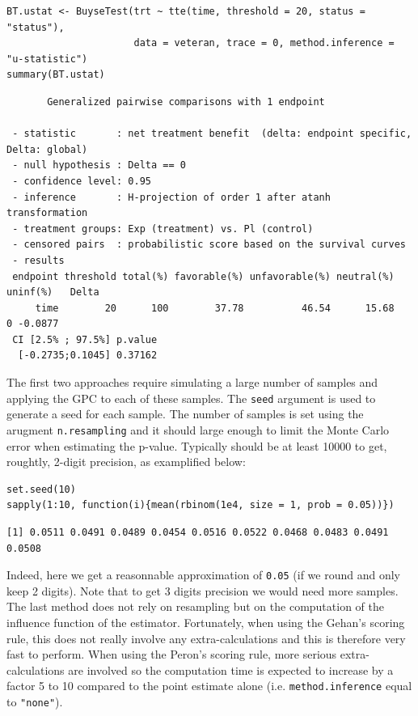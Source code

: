 \documentclass[12pt]{article}
\begin{document}
\lstset{language=r,label= ,caption= ,captionpos=b,numbers=none}
\begin{lstlisting}
BT.ustat <- BuyseTest(trt ~ tte(time, threshold = 20, status = "status"),
                      data = veteran, trace = 0, method.inference = "u-statistic") 
summary(BT.ustat)
\end{lstlisting}

\begin{verbatim}
       Generalized pairwise comparisons with 1 endpoint

 - statistic       : net treatment benefit  (delta: endpoint specific, Delta: global) 
 - null hypothesis : Delta == 0 
 - confidence level: 0.95 
 - inference       : H-projection of order 1 after atanh transformation 
 - treatment groups: Exp (treatment) vs. Pl (control) 
 - censored pairs  : probabilistic score based on the survival curves
 - results
 endpoint threshold total(%) favorable(%) unfavorable(%) neutral(%) uninf(%)   Delta
     time        20      100        37.78          46.54      15.68        0 -0.0877
 CI [2.5% ; 97.5%] p.value 
  [-0.2735;0.1045] 0.37162
\end{verbatim}

The first two approaches require simulating a large number of samples
and applying the GPC to each of these samples. The \texttt{seed} argument is
used to generate a seed for each sample. The number of samples is set
using the arugment \texttt{n.resampling} and it should large enough to limit
the Monte Carlo error when estimating the p-value. Typically should be
at least 10000 to get, roughtly, 2-digit precision, as examplified
below:
\lstset{language=r,label= ,caption= ,captionpos=b,numbers=none}
\begin{lstlisting}
set.seed(10)
sapply(1:10, function(i){mean(rbinom(1e4, size = 1, prob = 0.05))})
\end{lstlisting}

\begin{verbatim}
[1] 0.0511 0.0491 0.0489 0.0454 0.0516 0.0522 0.0468 0.0483 0.0491 0.0508
\end{verbatim}

Indeed, here we get a reasonnable approximation of \texttt{0.05} (if we round
and only keep 2 digits). Note that to get 3 digits precision we would
need more samples. The last method does not rely on resampling but on
the computation of the influence function of the
estimator. Fortunately, when using the Gehan's scoring rule, this does
not really involve any extra-calculations and this is therefore very
fast to perform. When using the Peron's scoring rule, more serious
extra-calculations are involved so the computation time is expected to
increase by a factor 5 to 10 compared to the point estimate alone
(i.e. \texttt{method.inference} equal to \texttt{"none"}).
\end{document}

